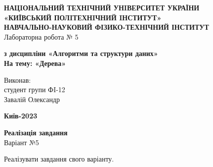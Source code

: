\documentclass[a4paper,12pt]{article}
\begin{document}
    \begin{center}
        \hfill \break
        \large{\textbf{НАЦIОНАЛЬНИЙ ТЕХНIЧНИЙ УНIВЕРСИТЕТ УКРАЇНИ\\
                «КИЇВСЬКИЙ ПОЛIТЕХНIЧНИЙ IНСТИТУТ»\\
                НАВЧАЛЬНО-НАУКОВИЙ ФІЗИКО-ТЕХНІЧНИЙ ІНСТИТУТ}}\\
        \hfill \break \hfill \break \hfill\break \hfill \break \hfill \break \hfill \break \hfill \break
        \hfill \break \hfill \break \hfill \break \hfill \break
        \large{Лабораторна робота № 5}
        \begin{center}
            \normalsize{\textbf{з дисципліни «Алгоритми та структури даних» \\
            На тему: «Дерева» \\}}
        \end{center}
    \end{center}
    \hfill \break \hfill \break \hfill \break \hfill \break \hfill \break \hfill \break \hfill \break
    \hfill \break \hfill \break \hfill \break \hfill \break \hfill \break \hfill \break 
    \begin{flushright}
        \large{ \hspace{35pt} Виконав:\\
            студент групи ФI-12\\
            Завалій Олександр} 
    \end{flushright}
    \hfill \break \hfill \break \hfill \break \hfill \break \hfill \break \hfill \break \hfill \break
    \hfill \break
    \begin{center} \textbf{Київ-2023} \end{center}
    \thispagestyle{empty}

\newpage
    \begin{center}
        \Large{\bfseries{Реалізація завдання}} \\
        \Large{Варіант №5}
    \end{center}
    Реалізувати завдання свого варіанту. 
\end{document}
